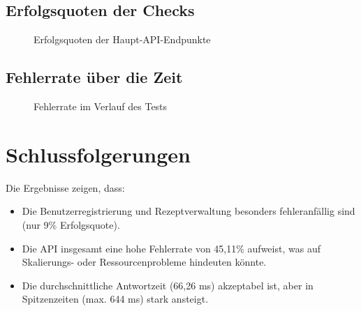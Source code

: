 \subsection*{Erfolgsquoten der Checks}
\begin{figure}
    \centering
    \caption{Erfolgsquoten der Haupt-API-Endpunkte}
    \label{fig:success_rates}
\end{figure}

\subsection*{Fehlerrate über die Zeit}
\begin{figure}
    \centering
    \caption{Fehlerrate im Verlauf des Tests}
    \label{fig:error_rate}
\end{figure}

\section*{Schlussfolgerungen}
Die Ergebnisse zeigen, dass:
\begin{itemize}
    \item Die Benutzerregistrierung und Rezeptverwaltung besonders fehleranfällig sind (nur 9\% Erfolgsquote).
    \item Die API insgesamt eine hohe Fehlerrate von 45,11\% aufweist, was auf Skalierungs- oder Ressourcenprobleme hindeuten könnte.
    \item Die durchschnittliche Antwortzeit (66,26 ms) akzeptabel ist, aber in Spitzenzeiten (max. 644 ms) stark ansteigt.
\end{itemize}

